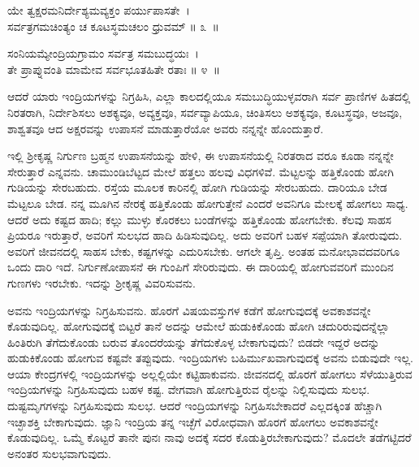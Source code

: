 \begin{shloka}
ಯೇ ತ್ವಕ್ಷರಮನಿರ್ದೇಶ್ಯಮವ್ಯಕ್ತಂ ಪರ್ಯುಪಾಸತೇ~।\\ಸರ್ವತ್ರಗಮಚಿಂತ್ಯಂ ಚ ಕೂಟಸ್ಥಮಚಲಂ ಧ್ರುವಮ್ \hfill॥ ೩~॥
\end{shloka}

\begin{shloka}
ಸಂನಿಯಮ್ಯೇಂದ್ರಿಯಗ್ರಾಮಂ ಸರ್ವತ್ರ ಸಮಬುದ್ಧಯಃ~।\\ತೇ ಪ್ರಾಪ್ನುವಂತಿ ಮಾಮೇವ ಸರ್ವಭೂತಹಿತೇ ರತಾಃ \hfill॥ ೪~॥
\end{shloka}

\begin{artha}
ಆದರೆ ಯಾರು ಇಂದ್ರಿಯಗಳನ್ನು ನಿಗ್ರಹಿಸಿ, ಎಲ್ಲಾ ಕಾಲದಲ್ಲಿಯೂ ಸಮಬುದ್ಧಿಯುಳ್ಳವರಾಗಿ ಸರ್ವ ಪ್ರಾಣಿಗಳ ಹಿತದಲ್ಲಿ ನಿರತರಾಗಿ, ನಿರ್ದೇಶಿಸಲು ಅಶಕ್ಯವೂ, ಅವ್ಯಕ್ತವೂ, ಸರ್ವವ್ಯಾಪಿಯೂ, ಚಿಂತಿಸಲು ಅಶಕ್ಯವೂ, ಕೂಟಸ್ಥವೂ, ಅಜವೂ, ಶಾಶ್ವತವೂ ಆದ ಅಕ್ಷರವನ್ನು ಉಪಾಸನೆ ಮಾಡು\-ತ್ತಾರೆಯೋ ಅವರು ನನ್ನನ್ನೇ ಹೊಂದುತ್ತಾರೆ.
\end{artha}

ಇಲ್ಲಿ ಶ‍್ರೀಕೃಷ್ಣ ನಿರ್ಗುಣ ಬ್ರಹ್ಮನ ಉಪಾಸನೆಯನ್ನು ಹೇಳಿ, ಈ ಉಪಾಸನೆಯಲ್ಲಿ ನಿರತರಾದ ವರೂ ಕೂಡಾ ನನ್ನನ್ನೇ ಸೇರುತ್ತಾರೆ ಎನ್ನವನು. ಚಾಮುಂಡಿಬೆಟ್ಟದ ಮೇಲೆ ಹತ್ತಲು ಹಲವು ವಿಧಗಳಿವೆ. ಮೆಟ್ಟಲನ್ನು ಹತ್ತಿಕೊಂಡು ಹೋಗಿ ಗುಡಿಯನ್ನು ಸೇರಬಹುದು. ರಸ್ತೆಯ ಮೂಲಕ ಕಾರಿನಲ್ಲಿ ಹೋಗಿ ಗುಡಿಯನ್ನು ಸೇರಬಹುದು. ದಾರಿಯೂ ಬೇಡ ಮೆಟ್ಟಲೂ ಬೇಡ. ನನ್ನ ಮೂಗಿನ ನೇರಕ್ಕೆ ಹತ್ತಿಕೊಂಡು ಹೋಗುತ್ತೇನೆ ಎಂದರೆ ಅವನಿಗೂ ಮೇಲಕ್ಕೆ ಹೋಗಲು ಸಾಧ್ಯ. ಆದರೆ ಅದು ಕಷ್ಟದ ಹಾದಿ; ಕಲ್ಲು ಮುಳ್ಳು ಕೊರಕಲು ಬಂಡೆಗಳನ್ನು ಹತ್ತಿಕೊಂಡು ಹೋಗಬೇಕು. ಕೆಲವು ಸಾಹಸ ಪ್ರಿಯರೂ ಇರುತ್ತಾರೆ, ಅವರಿಗೆ ಸುಲಭದ ಹಾದಿ ಹಿಡಿಸುವುದಿಲ್ಲ. ಅದು ಅವರಿಗೆ ಬಹಳ ಸಪ್ಪೆಯಾಗಿ ತೋರುವುದು. ಅವರಿಗೆ ಜೀವನದಲ್ಲಿ ಸಾಹಸ ಬೇಕು, ಕಷ್ಟಗಳನ್ನು ಎದುರಿಸಬೇಕು. ಆಗಲೇ ತೃಪ್ತಿ. ಅಂತಹ ಮನೋಭಾವದವರಿಗೂ ಒಂದು ದಾರಿ ಇದೆ. ನಿರ್ಗುಣೋಪಾಸನೆ ಈ ಗುಂಪಿಗೆ ಸೇರಿರುವುದು. ಈ ದಾರಿಯಲ್ಲಿ ಹೋಗುವವರಿಗೆ ಮುಂದಿನ ಗುಣಗಳು ಇರಬೇಕು. ಇದನ್ನು ಶ‍್ರೀಕೃಷ್ಣ ವಿವರಿಸುವನು.

ಅವನು ಇಂದ್ರಿಯಗಳನ್ನು ನಿಗ್ರಹಿಸುವನು. ಹೊರಗೆ ವಿಷಯವಸ್ತುಗಳ ಕಡೆಗೆ ಹೋಗುವುದಕ್ಕೆ ಅವಕಾಶವನ್ನೇ ಕೊಡುವುದಿಲ್ಲ. ಹೋಗುವುದಕ್ಕೆ ಬಿಟ್ಟರೆ ತಾನೆ ಅದನ್ನು ಆಮೇಲೆ ಹುಡುಕಿಕೊಂಡು ಹೋಗಿ ಚದುರಿರುವುದನ್ನೆಲ್ಲಾ ಹಿಂತಿರುಗಿ ತೆಗೆದುಕೊಂಡು ಬರುವ ತೊಂದರೆಯನ್ನು ತೆಗೆದುಕೊಳ್ಳ ಬೇಕಾಗುವುದು? ಬಿಡದೇ ಇದ್ದರೆ ಅದನ್ನು ಹುಡುಕಿಕೊಂಡು ಹೋಗುವ ಕಷ್ಟವೇ ತಪ್ಪುವುದು. ಇಂದ್ರಿಯಗಳು ಬಹಿರ್ಮುಖವಾಗುವುದಕ್ಕೆ ಅವನು ಬಿಡುವುದೇ ಇಲ್ಲ. ಆಯಾ ಕೇಂದ್ರಗಳಲ್ಲಿ ಇಂದ್ರಿಯಗಳನ್ನು ಅಲ್ಲಲ್ಲಿಯೇ ಕಟ್ಟಿಹಾಕುವನು. ಜೀವನದಲ್ಲಿ ಹೊರಗೆ ಹೋಗಲು ಸೆಳೆಯುತ್ತಿರುವ ಇಂದ್ರಿಯಗಳನ್ನು ನಿಗ್ರಹಿಸುವುದು ಬಹಳ ಕಷ್ಟ. ವೇಗವಾಗಿ ಹೋಗುತ್ತಿರುವ ರೈಲನ್ನು ನಿಲ್ಲಿಸುವುದು ಸುಲಭ. ದುಷ್ಟಮೃಗಗಳನ್ನು ನಿಗ್ರಹಿಸುವುದು ಸುಲಭ. ಆದರೆ ಇಂದ್ರಿಯಗಳನ್ನು ನಿಗ್ರಹಿಸಬೇಕಾದರೆ ಎಲ್ಲದಕ್ಕಿಂತ ಹೆಚ್ಚಾಗಿ ಇಚ್ಛಾಶಕ್ತಿ ಬೇಕಾಗುವುದು. ಜ್ಞಾನಿ ಇಂದ್ರಿಯ ತನ್ನ ಇಚ್ಛೆಗೆ ವಿರೋಧವಾಗಿ ಹೊರಗೆ ಹೋಗಲು ಅವಕಾಶವನ್ನೇ ಕೊಡುವುದಿಲ್ಲ. ಒಮ್ಮೆ ಕೊಟ್ಟರೆ ತಾನೇ ಪುನಃ ನಾವು ಅದಕ್ಕೆ ಸದರ ಕೊಡುತ್ತಿರಬೇಕಾಗುವುದು? ಮೊದಲೇ ತಡೆಗಟ್ಟಿದರೆ ಅನಂತರ ಸುಲಭವಾಗುವುದು.

